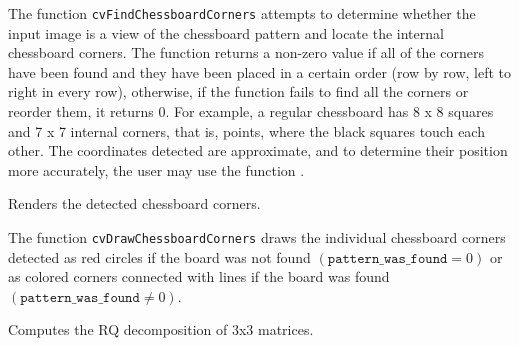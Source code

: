The function \texttt{cvFindChessboardCorners} attempts to determine
whether the input image is a view of the chessboard pattern and
locate the internal chessboard corners. The function returns a non-zero
value if all of the corners have been found and they have been placed
in a certain order (row by row, left to right in every row),
otherwise, if the function fails to find all the corners or reorder
them, it returns 0. For example, a regular chessboard has 8 x 8
squares and 7 x 7 internal corners, that is, points, where the black
squares touch each other. The coordinates detected are approximate,
and to determine their position more accurately, the user may use
the function .

\label{DrawChessBoardCorners}

Renders the detected chessboard corners.


\begin{description}
\end{description}

The function \texttt{cvDrawChessboardCorners} draws the individual chessboard corners detected as red circles if the board was not found $(\texttt{pattern\_was\_found} =0)$ or as colored corners connected with lines if the board was found $(\texttt{pattern\_was\_found} \ne 0)$.


\label{RQDecomp3x3}

Computes the RQ decomposition of 3x3 matrices.


